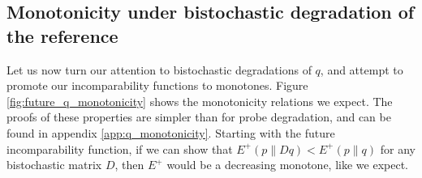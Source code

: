 \subsection{Monotonicity under bistochastic degradation of the reference} \label{sec:q_monotonicity}

Let us now turn our attention to bistochastic degradations of $q$, and attempt to promote our incomparability functions to monotones. Figure \ref{fig:future_q_monotonicity} shows the monotonicity relations we expect. The proofs of these properties are simpler than for probe degradation, and can be found in appendix \ref{app:q_monotonicity}. Starting with the future incomparability function, if we can show that $E^+(p \parallel Dq) < E^+(p \parallel q)$ for any bistochastic matrix $D$, then $E^+$ would be a decreasing monotone, like we expect.

